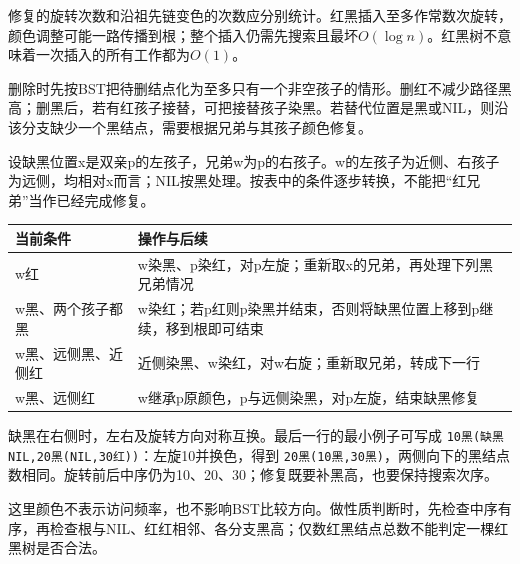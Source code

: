 修复的旋转次数和沿祖先链变色的次数应分别统计。红黑插入至多作常数次旋转，颜色调整可能一路传播到根；整个插入仍需先搜索且最坏\(O(\log n)\)。红黑树不意味着一次插入的所有工作都为\(O(1)\)。

删除时先按BST把待删结点化为至多只有一个非空孩子的情形。删红不减少路径黑高；删黑后，若有红孩子接替，可把接替孩子染黑。若替代位置是黑或NIL，则沿该分支缺少一个黑结点，需要根据兄弟与其孩子颜色修复。

设缺黑位置x是双亲p的左孩子，兄弟w为p的右孩子。w的左孩子为近侧、右孩子为远侧，均相对x而言；NIL按黑处理。按表中的条件逐步转换，不能把``红兄弟''当作已经完成修复。

\begin{wideblock}

\par\medskip\noindent\begin{minipage}{\linewidth}\fontsize{9.3}{12}\selectfont\begin{tabularx}{\linewidth}{@{}YY@{}}
\toprule\noalign{}
\begin{minipage}[b]{\linewidth}\raggedright
当前条件
\end{minipage} & \begin{minipage}[b]{\linewidth}\raggedright
操作与后续
\end{minipage} \\
\midrule\noalign{}


w红 & w染黑、p染红，对p左旋；重新取x的兄弟，再处理下列黑兄弟情况 \\
w黑、两个孩子都黑 & w染红；若p红则p染黑并结束，否则将缺黑位置上移到p继续，移到根即可结束 \\
w黑、远侧黑、近侧红 & 近侧染黑、w染红，对w右旋；重新取兄弟，转成下一行 \\
w黑、远侧红 & w继承p原颜色，p与远侧染黑，对p左旋，结束缺黑修复 \\
\bottomrule\end{tabularx}
\end{minipage}\par\medskip

\end{wideblock}

缺黑在右侧时，左右及旋转方向对称互换。最后一行的最小例子可写成 \texttt{10黑(\allowbreak{}缺黑NIL,\allowbreak{}20黑(\allowbreak{}NIL,\allowbreak{}30红)\allowbreak{})\allowbreak{}}：左旋10并换色，得到 \texttt{20黑(\allowbreak{}10黑,\allowbreak{}30黑)\allowbreak{}}，两侧向下的黑结点数相同。旋转前后中序仍为10、20、30；修复既要补黑高，也要保持搜索次序。

这里颜色不表示访问频率，也不影响BST比较方向。做性质判断时，先检查中序有序，再检查根与NIL、红红相邻、各分支黑高；仅数红黑结点总数不能判定一棵红黑树是否合法。

